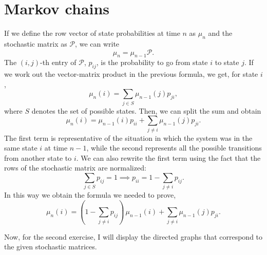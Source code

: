 \section{Markov chains}
If we define the row vector of state probabilities at time $n$ as $\mu_{n}$ and
the stochastic matrix as $\mathcal{P}$, we can write
\begin{equation}
    \mu_{n} = \mu_{n-1} \mathcal{P}.
\end{equation}
The $(i, j)$-th entry of $\mathcal{P}$, $p_{ij}$, is the probability to go from
state $i$ to state $j$. If we work out the vector-matrix product in the previous
formula, we get, for state $i$,
\begin{equation}
    \mu_{n}(i) = \sum_{j \in S} \mu_{n-1}(j) p_{ji},
\end{equation}
where $S$ denotes the set of possible states. Then, we can split the sum and
obtain
\begin{equation}
    \mu_{n}(i) = \mu_{n-1}(i) p_{ii} + \sum_{j \neq i} \mu_{n-1}(j) p_{ji}.
\end{equation}
The first term is representative of the situation in which the system was in the
same state $i$ at time $n-1$, while the second represents all the possible
transitions from another state to $i$. We can also rewrite the first term using
the fact that the rows of the stochastic matrix are normalized:
\begin{equation}
    \sum_{j \in S} p_{ij} = 1 \implies p_{ii} = 1 - \sum_{j \neq i} p_{ij}.
\end{equation}
In this way we obtain the formula we needed to prove,
\begin{equation}
    \mu_{n}(i) = \left(1 - \sum_{j \neq i} p_{ij}\right)
    \, \mu_{n-1}(i) + \sum_{j \neq i} \mu_{n-1}(j) p_{ji}.
\end{equation}

Now, for the second exercise, I will display the directed graphs that correspond
to the given stochastic matrices.

